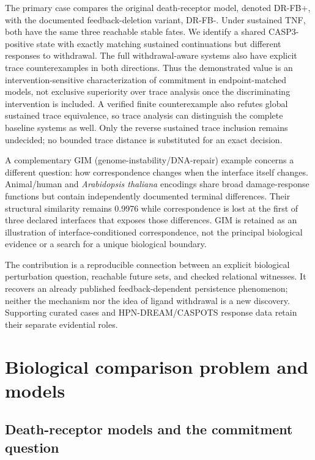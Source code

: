 \documentclass{ws-jbcb}
\numberwithin{equation}{section}
\newcommand{\tas}{\textit{Arabidopsis thaliana}}
\begin{document}
The primary case compares the original death-receptor model, denoted DR-FB+,
with the documented feedback-deletion variant, DR-FB-. Under sustained TNF,
both have the same three reachable stable fates. We identify a shared
CASP3-positive state with exactly matching sustained continuations but different
responses to withdrawal. The full withdrawal-aware systems also have explicit
trace counterexamples in both directions. Thus the demonstrated value is an
intervention-sensitive characterization of commitment in endpoint-matched
models, not exclusive superiority over trace analysis once the discriminating
intervention is included. A verified finite counterexample also refutes global
sustained trace equivalence, so trace analysis can distinguish the complete
baseline systems as well. Only the reverse sustained trace inclusion remains
undecided; no bounded trace distance is substituted for an exact decision.

A complementary GIM (genome-instability/DNA-repair) example concerns a different
question: how correspondence changes when the interface itself changes.
Animal/human and \tas{} encodings share broad damage-response functions but
contain independently documented terminal differences.\cite{JacksonBartek2009,
BlackfordJackson2017,Yoshiyama2013,DeSchutter2007,Yi2014,Adachi2011}
Their structural similarity remains 0.9976 while correspondence is lost at the
first of three declared interfaces that exposes those differences. GIM is
retained as an illustration of interface-conditioned correspondence, not the
principal biological evidence or a search for a unique biological boundary.

The contribution is a reproducible connection between an explicit biological
perturbation question, reachable future sets, and checked relational witnesses.
It recovers an already published feedback-dependent persistence phenomenon;
neither the mechanism nor the idea of ligand withdrawal is a new discovery.
Supporting curated cases and HPN-DREAM/CASPOTS response data retain their
separate evidential roles.\cite{Hill2016,Razzaq2018}

\section{Biological comparison problem and models}
\label{sec:applications}

\subsection{Death-receptor models and the commitment question}\label{sec:death-models}
\end{document}

